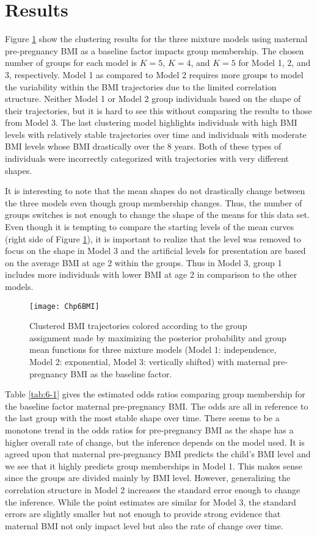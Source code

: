 \section{Results}
Figure \ref{fig:6-1} show the clustering results for the three mixture models using maternal pre-pregnancy BMI as a baseline factor impacts group membership. The chosen number of groups for each model is $K = 5$, $K=4$, and $K=5$ for Model 1, 2, and 3, respectively. Model 1 as compared to Model 2 requires more groups to model the variability within the BMI trajectories due to the limited correlation structure. Neither Model 1 or Model 2 group individuals based on the shape of their trajectories, but it is hard to see this without comparing the results to those from Model 3. The last clustering model highlights individuals with high BMI levels with relatively stable trajectories over time and individuals with moderate BMI levels whose BMI drastically over the 8 years. Both of these types of individuals were incorrectly categorized with trajectories with very different shapes.

It is interesting to note that the mean shapes do not drastically change between the three models even though group membership changes. Thus, the number of groups switches is not enough to change the shape of the means for this data set. Even though it is tempting to compare the starting levels of the mean curves (right side of Figure \ref{fig:6-1}), it is important to realize that the level was removed to focus on the shape in Model 3 and the artificial levels for presentation are based on the average BMI at age 2 within the groups. Thus in Model 3, group 1 includes more individuals with lower BMI at age 2 in comparison to the other models. 

\begin{figure}[h]
\centering
\texttt{[image: Chp6BMI]}
\label{fig:6-1}
\caption{Clustered BMI trajectories colored according to the group assignment made by maximizing the posterior probability and group mean functions for three mixture models (Model 1: independence, Model 2: exponential, Model 3: vertically shifted) with maternal pre-pregnancy BMI as the baseline factor.}
\end{figure}

Table \ref{tab:6-1} gives the estimated odds ratios comparing group membership for the baseline factor maternal pre-pregnancy BMI. The odds are all in reference to the last group with the most stable shape over time. There seems to be a monotone trend in the odds ratios for pre-pregnancy BMI as the shape has a higher overall rate of change, but the inference depends on the model used. It is agreed upon that maternal pre-pregnancy BMI predicts the child's BMI level and we see that it highly predicts group memberships in Model 1. This makes sense since the groups are divided mainly by BMI level. However, generalizing the correlation structure in Model 2 increases the standard error enough to change the inference. While the point estimates are similar for Model 3, the standard errors are slightly smaller but not enough to provide strong evidence that maternal BMI not only impact level but also the rate of change over time. 

